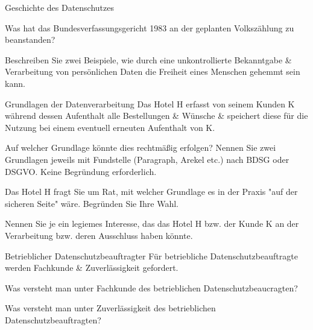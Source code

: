 \documentclass{exercisesheet}
\author{Leopold Lemmermann}
\begin{document}
\createtitle

\begin{exercise**}{Geschichte des Datenschutzes}
  \item Was hat das Bundesverfassungsgericht 1983 an der geplanten Volkszählung zu beanstanden?
  \item Beschreiben Sie zwei Beispiele, wie durch eine unkontrollierte Bekanntgabe \& Verarbeitung von persönlichen Daten die Freiheit eines Menschen gehemmt sein kann.
\end{exercise**}



\begin{exercise*}{Grundlagen der Datenverarbeitung}{
    Das Hotel H erfasst von seinem Kunden K während dessen Aufenthalt alle Bestellungen \& Wünsche \& speichert diese für die Nutzung bei einem eventuell erneuten Aufenthalt von K.
  }
  \item Auf welcher Grundlage könnte dies rechtmäßig erfolgen? Nennen Sie zwei Grundlagen jeweils mit Fundstelle (Paragraph, Arekel etc.) nach BDSG oder DSGVO. Keine Begründung erforderlich.
  \item Das Hotel H fragt Sie um Rat, mit welcher Grundlage es in der Praxis "auf der sicheren Seite" wäre. Begründen Sie Ihre Wahl.
  \item Nennen Sie je ein legiemes Interesse, das das Hotel H bzw. der Kunde K an der Verarbeitung bzw. deren Ausschluss haben könnte.
\end{exercise*}

\begin{exercise*}{Betrieblicher Datenschutzbeauftragter}{
    Für betriebliche Datenschutzbeauftragte werden Fachkunde \& Zuverlässigkeit gefordert.
  }
  \item Was versteht man unter Fachkunde des betrieblichen Datenschutzbeaucragten?
  \item Was versteht man unter Zuverlässigkeit des betrieblichen Datenschutzbeauftragten?
\end{exercise*}
\end{document}
